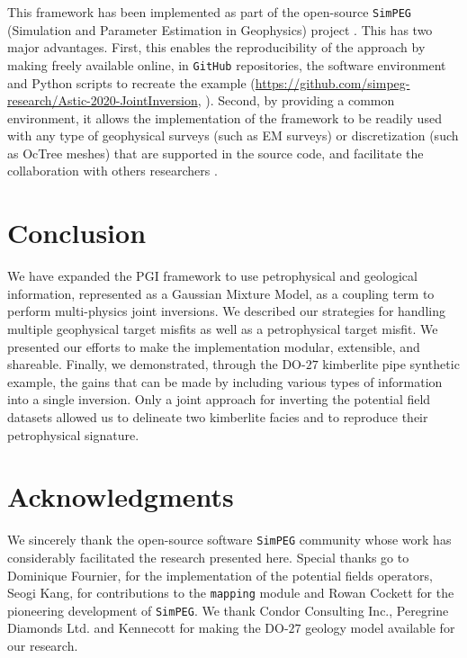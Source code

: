 \documentclass[extra, mreferee]{gji_joint} %
\begin{document}
This framework has been implemented as part of the open-source \texttt{SimPEG} (Simulation and Parameter Estimation in Geophysics) project \citep{Cockett2015}. This has two major advantages. First, this enables the reproducibility of the approach by making freely available online, in \texttt{GitHub} repositories, the software environment and Python scripts to recreate the example (\url{https://github.com/simpeg-research/Astic-2020-JointInversion}, \citet{PGIJointExamples}). Second, by providing a common environment, it allows the implementation of the framework to be readily used with any type of geophysical surveys (such as EM surveys) or discretization (such as OcTree meshes) that are supported in the source code, and facilitate the collaboration with others researchers \citep{SeogiJointEM}.

\section{Conclusion}

We have expanded the PGI framework to use petrophysical and geological information, represented as a Gaussian Mixture Model, as a coupling term to perform multi-physics joint inversions. We described our strategies for handling multiple geophysical target misfits as well as a petrophysical target misfit. We presented our efforts to make the implementation modular, extensible, and shareable. Finally, we demonstrated, through the DO-$27$ kimberlite pipe synthetic example, the gains that can be made by including various types of information into a single inversion. Only a joint approach for inverting the potential field datasets allowed us to delineate two kimberlite facies and to reproduce their petrophysical signature.

\section{Acknowledgments}

We sincerely thank the open-source software \texttt{SimPEG} community whose work has considerably facilitated the research presented here. Special thanks go to Dominique Fournier, for the implementation of the potential fields operators, Seogi Kang, for contributions to the \texttt{mapping} module \citep{SeogiMapping} and Rowan Cockett for the pioneering development of \texttt{SimPEG}. We thank Condor Consulting Inc., Peregrine Diamonds Ltd. and Kennecott for making the DO-$27$ geology model available for our research.
\end{document}
